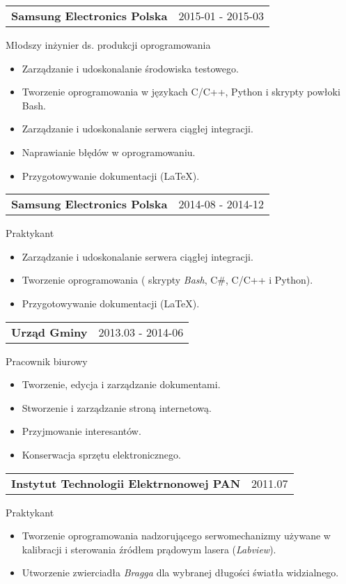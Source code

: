 \documentclass{article}
\begin{document}
\begin{tabular}{@{} m{} R{0.37\textwidth} }
	\textbf{Samsung Electronics Polska}	& {2015-01 - 2015-03}
\end{tabular}
Młodszy inżynier ds. produkcji oprogramowania\\
\begin{itemize}
	\item Zarządzanie i udoskonalanie środowiska testowego.
	\item Tworzenie oprogramowania w językach C/C++, Python i skrypty powłoki Bash.
	\item Zarządzanie i udoskonalanie serwera ciągłej integracji. 
	\item Naprawianie błędów w oprogramowaniu.
	\item Przygotowywanie dokumentacji (\LaTeX).
\end{itemize}
\begin{tabular}{@{} m{} R{0.37\textwidth} }
	{ \textbf{Samsung Electronics Polska}}	& {2014-08 - 2014-12} 
\end{tabular}
Praktykant\\
\begin{itemize}
	\item Zarządzanie i udoskonalanie serwera ciągłej integracji. 
	\item Tworzenie oprogramowania ( skrypty \emph{Bash}, C\#, C/C++ i Python).
	\item Przygotowywanie dokumentacji (\LaTeX).
\end{itemize}
\begin{tabular}{@{} m{} R{0.37\textwidth} }
\textbf{Urząd Gminy}	& {2013.03 - 2014-06} 
\end{tabular}
Pracownik biurowy\\
\begin{itemize}
	\item Tworzenie, edycja i zarządzanie dokumentami.
	\item Stworzenie i zarządzanie stroną internetową.
	\item Przyjmowanie interesantów.
	\item Konserwacja sprzętu elektronicznego.
\end{itemize}

\begin{tabular}{@{} m{} R{0.47\textwidth} }
\textbf{Instytut Technologii Elektrnonowej PAN}	& {2011.07} 
\end{tabular}
Praktykant\\
\begin{itemize}
	\item Tworzenie oprogramowania nadzorującego serwomechanizmy używane w kalibracji i sterowania źródłem prądowym  lasera (\emph{Labview}).
	\item Utworzenie zwierciadła \emph{Bragga} dla wybranej długości światła widzialnego.
\end{itemize}
\end{document}
